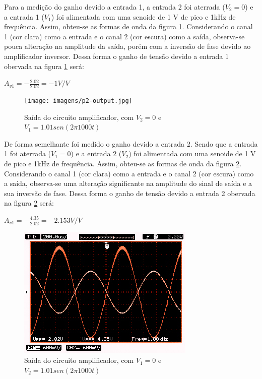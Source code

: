 Para a medição do ganho devido a entrada 1, a entrada 2 foi aterrada ($V_2=0$) e a entrada 1 ($V_1$) foi alimentada com uma senoide de 1 V de pico e 1kHz de frequência. Assim, obteu-se as formas de onda da figura \ref{p2-out}. Considerando o canal 1 (cor clara) como a entrada e o canal 2 (cor escura) como a saída, observa-se pouca alteração na amplitude da saída, porém com a inversão de fase devido ao amplificador inversor. Dessa forma o ganho de tensão devido a entrada 1 obervada na figura \ref{p2-out} será:

\begin{center}
    $A_{v1} = -\frac{2.02}{2.02} = -1 V/V$
\end{center}

\begin{figure}[H] 
\texttt{[image: imagens/p2-output.jpg]} 
\centering
\caption{Saída do circuito amplificador, com $V_2=0$ e $V_1=1.01 sen(2\pi1000t)$}
\label{p2-out} 
\end{figure} 

De forma semelhante foi medido o ganho devido a entrada 2. Sendo que a entrada 1 foi aterrada ($V_1=0$) e a entrada 2 ($V_2$) foi alimentada com uma senoide de 1 V de pico e 1kHz de frequência. Assim, obteu-se as formas de onda da figura \ref{p3-out}. Considerando o canal 1 (cor clara) como a entrada e o canal 2 (cor escura) como a saída, observa-se uma alteração significante na amplitude do sinal de saída e a sua inversão de fase. Dessa forma o ganho de tensão devido a entrada 2 obervada na figura \ref{p3-out} será:


\begin{center}
    $A_{v1} = -\frac{4.35}{2.02} = -2.153 V/V$
\end{center}

\begin{figure}[H] 
\includegraphics[scale=2.5]{imagens/p3-output.jpg} 
\centering
\caption{Saída do circuito amplificador, com $V_1=0$ e $V_2=1.01 sen(2\pi1000t)$}
\label{p3-out} 
\end{figure} 

